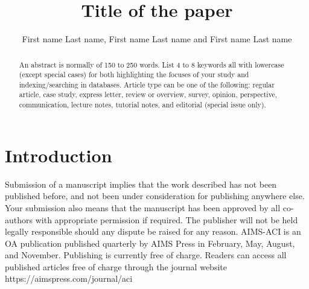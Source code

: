 \documentclass{aci}
\begin{document}
\title{Title of the paper}

\author{%
  First name Last name, First name Last name and First name
  Last name\corrauth}


\address{%
   }


\begin{abstract}
  An abstract is normally of 150 to 250 words. List 4 to 8 keywords all with
  lowercase (except special cases) for both highlighting the focuses of your
  study and indexing/searching in databases. Article type can be one of the
  following: regular article, case study, express letter, review or overview,
  survey, opinion, perspective, communication, lecture notes, tutorial notes,
  and editorial (special issue only).

\end{abstract}




\maketitle

\section{Introduction}

Submission of a manuscript implies that the work described has not been
published before, and not been under consideration for publishing anywhere else.
Your submission also means that the manuscript has been approved by all
co-authors with appropriate permission if required. The publisher will not be
held legally responsible should any dispute be raised for any reason. AIMS-ACI
is an OA publication published quarterly by AIMS Press in February, May, August,
and November. Publishing is currently free of charge. Readers can access all
published articles free of charge through the journal website
https://aimspress.com/journal/aci
\end{document}
